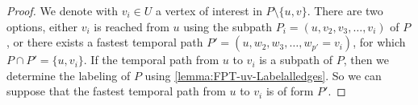 \documentclass[11pt,a4paper]{article}
\theoremstyle{remark}
\theoremstyle{definition}
\begin{document}
\begin{proof}
We denote with $v_i \in U$ a vertex of interest in $P \setminus \{u,v\}$.
There are two options, either $v_i$ is reached from $u$ using the subpath $P_i = (u, v_2, v_3, \dots, v_i)$ of $P$,
or there exists a fastest temporal path $P' = (u, w_2, w_3, \dots, w_{p'} = v_i)$, for which $P \cap P' = \{u, v_i\}$.
If the temporal path from $u$ to $v_i$ is a subpath of $P$, then we determine the labeling of $P$ using \cref{lemma:FPT-uv-Labelalledges}.
So we can suppose that the fastest temporal path from $u$ to $v_i$ is of form $P'$.
\end{proof}

\end{document}
